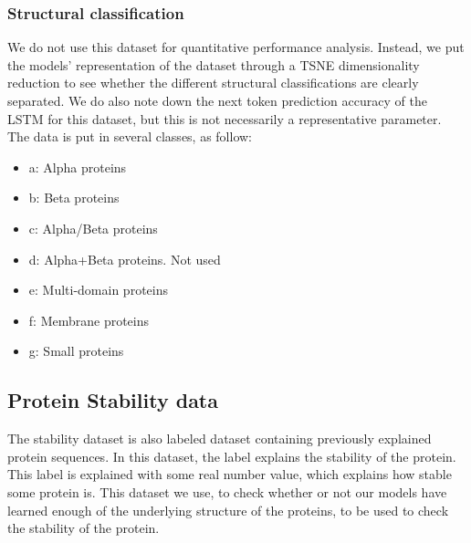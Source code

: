 \noindent
\subsubsection{Structural classification}
We do not use this dataset for quantitative performance analysis. Instead, we put the models' representation of the dataset through a TSNE dimensionality reduction to see whether the different structural classifications are clearly separated. We do also note down the next token prediction accuracy of the LSTM for this dataset, but this is not necessarily a representative parameter. The data is put in several classes, as follow:
\begin{itemize}
    \item a: Alpha proteins
    \item b: Beta proteins
    \item c: Alpha/Beta proteins
    \item d: Alpha+Beta proteins. Not used
    \item e: Multi-domain proteins
    \item f: Membrane proteins
    \item g: Small proteins
\end{itemize}

\subsection{Protein Stability data}
The stability dataset is also labeled dataset containing previously explained protein sequences. In this dataset, the label explains the stability of the protein. This label is explained with some real number value, which explains how stable some protein is. This dataset we use, to check whether or not our models have learned enough of the underlying structure of the proteins, to be used to check the stability of the protein.


